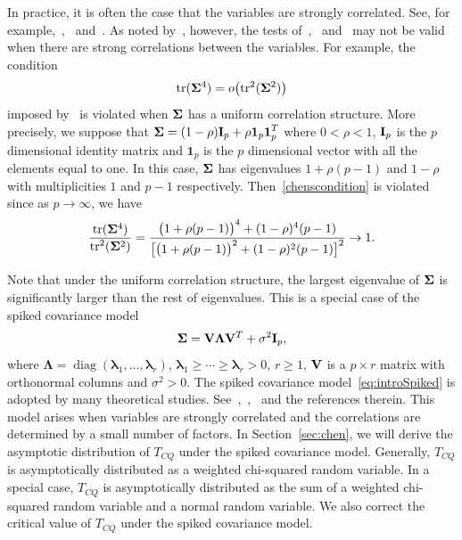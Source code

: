 \documentclass[3p]{elsarticle}
\DeclareMathOperator{\mytr}{tr}
\DeclareMathOperator{\mydiag}{diag}
\newcommand{\bfsym}[1]{\ensuremath{\boldsymbol{#1}}}
\def\blambda {\bfsym {\lambda}}        \def\bLambda {\bfsym {\Lambda}}
\theoremstyle{plain}
\theoremstyle{definition}
\theoremstyle{remark}
\begin{document}
In practice, it is often the case that the variables are strongly correlated.
See, for example,~\cite{Chen2011A},~\cite{Thulin2014A} and~\cite{Ma2015A}.
As noted by~\cite{Ma2015A}, however, the tests of~\cite{Bai1996Efiect},~\cite{Srivastava2008A} and~\cite{Chen2010A} may not be valid when there are strong correlations between the variables.
For example, the condition 
\begin{equation}\label{chenscondition}
    \mathrm{tr}(\bSigma^4)=o\big(\mathrm{tr}^2(\bSigma^2)\big)
\end{equation}
imposed by~\cite{Chen2010A} is violated when $\bSigma$ has a uniform correlation structure.
More precisely, we suppose that
$\bSigma=(1-\rho)\BI_p+\rho\textbf{1}_p \textbf{1}_p^T$ where $0<\rho<1$, $\mathbf{I}_p$ is the $p$ dimensional identity matrix and $\bm{1}_p$ is the $p$ dimensional vector with all the elements equal to one.
In this case, $\bSigma$ has eigenvalues $1+\rho(p-1) $ and $1-\rho$ with multiplicities $1$ and $p-1$ respectively. Then~\eqref{chenscondition} is violated since 
as $p\to \infty$, we have
$$
\frac{\mytr (\bSigma^4)}{\mytr^2(\bSigma^2)}=\frac{\big(1+\rho(p-1)\big)^4 + (1-\rho)^4 (p-1)}{\big[ \big(1+\rho(p-1)\big)^2+(1-\rho)^2 (p-1) \big]^2}\to 1.
$$

  Note that under the uniform correlation structure, the largest eigenvalue of $\bSigma$ is significantly larger than the rest of eigenvalues.
  This is a special case of the spiked covariance model
 \begin{equation}\label{eq:introSpiked}
 \bSigma =\BV\bLambda \BV^T +\sigma^2 \BI_p,
 \end{equation}
 where $\bLambda=\mydiag(\blambda_1,\ldots,\blambda_r)$, $\blambda_1\geq \cdots\geq \blambda_r>0$, $r\geq 1$, $\mathbf{V}$ is a $p\times r$ matrix with orthonormal columns and $\sigma^2>0$.
The spiked covariance model~\eqref{eq:introSpiked} is adopted by many theoretical studies. See~\cite{Cai2012Sparse},~\cite{Birnbaum2013},~\cite{Passemier2015} and the references therein.
This model arises when variables are strongly correlated and the correlations are determined by a small number of factors.
 In Section~\ref{sec:chen}, we will derive the asymptotic distribution of $T_{CQ}$ under the spiked covariance model. 
Generally, $T_{CQ}$ is asymptotically distributed as a weighted chi-squared random variable.
In a special case, $T_{CQ}$ is asymptotically distributed as the sum of a weighted chi-squared random variable and a normal random variable. 
We also correct the critical value of $T_{CQ}$ under the spiked covariance model.
\end{document}
